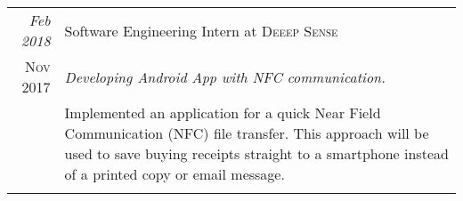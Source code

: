 \documentclass[a4paper,12pt]{article}
\begin{document}
\begin{tabular}{r|p{11cm}}
	\emph{Feb 2018} & Software Engineering Intern at \textsc{Deeep Sense} \\\textsc{Nov 2017}&\emph{Developing Android App with NFC communication.}\\&\footnotesize{Implemented an application for a quick Near Field Communication (NFC) file transfer. This approach will be used to save buying receipts straight to a smartphone instead of a printed copy or email message.}\\\multicolumn{2}{c}{}
\end{tabular}
 
\end{document}
